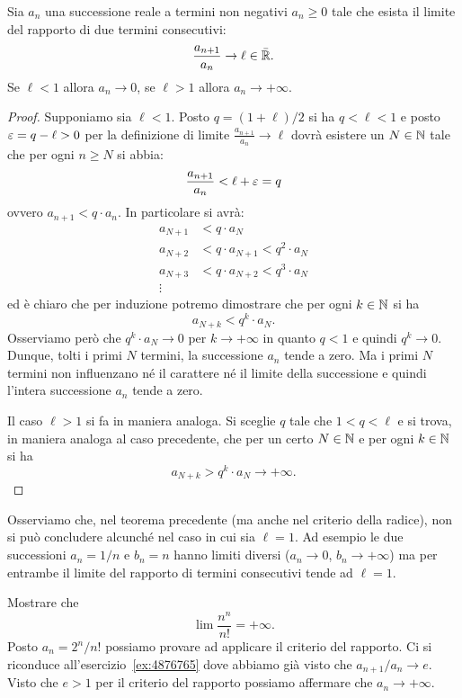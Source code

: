 \begin{theorem}
\label{th:criterio_rapporto}
  Sia $a_n$ una successione reale a termini non negativi
  $a_n \ge 0$ tale che esista il limite del rapporto di due termini consecutivi:
  \[
     \frac{a_{n+1}}{a_n} \to \ell \in \bar {\mathbb R}.
  \]
  Se $\ell < 1$ allora $a_n \to 0$, se $\ell >1$ allora $a_n \to +\infty$.
\end{theorem}
%
\begin{proof}
Supponiamo sia $\ell<1$. Posto $q=(1+\ell)/2$ si ha $q < \ell < 1$ e posto $\varepsilon=q-\ell>0$ per la definizione di limite $\frac{a_{n+1}}{a_n}\to \ell$ dovrà esistere un $N\in \mathbb N$ tale
che per ogni $n\ge N$ si abbia:
\[
  \frac{a_{n+1}}{a_n} < \ell + \varepsilon = q
\]
ovvero $a_{n+1} < q \cdot a_n$. In particolare si avrà:
\begin{align*}
  a_{N+1} &< q \cdot a_N \\
  a_{N+2} &< q \cdot a_{N+1} < q^2\cdot a_N \\
  a_{N+3} &< q \cdot a_{N+2} < q^3\cdot a_N \\
  \vdots
\end{align*}
ed è chiaro che per induzione potremo dimostrare che per
ogni $k\in \mathbb N$ si ha
\[
  a_{N+k} < q^k\cdot a_N.
\]
Osserviamo però che $q^k \cdot a_N \to 0$ per $k\to +\infty$
in quanto $q<1$ e quindi $q^k \to 0$. Dunque, tolti i primi $N$ termini, la successione $a_n$ tende a zero. Ma i primi $N$ termini non influenzano né il carattere né il limite della successione e quindi l'intera successione $a_n$ tende a zero.

Il caso $\ell>1$ si fa in maniera analoga. Si sceglie $q$ tale
che $1<q<\ell$ e si trova, in maniera analoga al caso precedente,
che per un certo $N\in \mathbb N$ e per ogni $k\in \mathbb N$ si ha
\[
  a_{N+k} > q^k \cdot a_N \to +\infty.
\]
\end{proof}

Osserviamo che, nel teorema precedente (ma anche nel criterio della radice),
non si può concludere alcunché nel
caso in cui sia $\ell = 1$.
Ad esempio le due successioni $a_n = 1/n$ e $b_n = n$
hanno limiti diversi ($a_n \to 0$, $b_n\to +\infty$) ma per entrambe
il limite del rapporto di termini consecutivi tende ad $\ell=1$.

\begin{exercise}
Mostrare che
\[
  \lim \frac{n^n}{n!} = +\infty.
\]
Posto $a_n = 2^n / n!$ possiamo provare ad applicare il criterio del rapporto.
Ci si riconduce all'esercizio~\ref{ex:4876765} dove abbiamo già visto
che $a_{n+1} / a_n \to e$.
Visto che $e>1$ per il criterio del rapporto possiamo affermare che
$a_n \to +\infty$.
\end{exercise}

